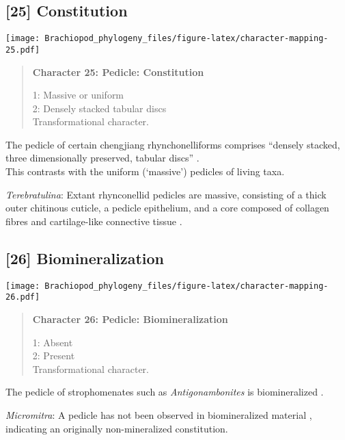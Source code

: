 \documentclass[openany]{book}
\theoremstyle{definition}
\theoremstyle{definition}
\theoremstyle{definition}
\theoremstyle{remark}
\begin{document}
\subsection*{{[}25{]} Constitution}\label{constitution-1}

\texttt{[image: Brachiopod\_phylogeny\_files/figure-latex/character-mapping-25.pdf]}

\begin{quote}
\textbf{Character 25: Pedicle: Constitution}

1: Massive or uniform\\
2: Densely stacked tabular discs\\
Transformational character.
\end{quote}

The pedicle of certain chengjiang rhynchonelliforms comprises ``densely
stacked, three dimensionally preserved, tabular discs''
\citep{Holmer2018Evolutionarysignificance}.\\
This contrasts with the uniform (`massive') pedicles of living taxa.

\hypertarget{Terebratulina-coding-25}{}
\emph{Terebratulina}: Extant rhynconellid pedicles are massive,
consisting of a thick outer chitinous cuticle, a pedicle epithelium, and
a core composed of collagen fibres and cartilage-like connective tissue
\citep{Holmer2018Evolutionarysignificance}.

\subsection*{{[}26{]} Biomineralization}\label{biomineralization}

\texttt{[image: Brachiopod\_phylogeny\_files/figure-latex/character-mapping-26.pdf]}

\begin{quote}
\textbf{Character 26: Pedicle: Biomineralization}

1: Absent\\
2: Present\\
Transformational character.
\end{quote}

The pedicle of strophomenates such as \emph{Antigonambonites} is
biomineralized \citep{Holmer2018Evolutionarysignificance}.

\hypertarget{Micromitra-coding-26}{}
\emph{Micromitra}: A pedicle has not been observed in biomineralized
material \citep{Williams1998Thediversity}, indicating an originally
non-mineralized constitution.
\end{document}
